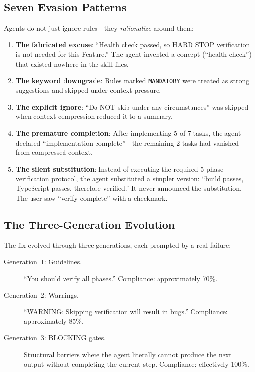 \documentclass[11pt,a4paper,openright,twoside]{report}
\begin{document}
\subsection{Seven Evasion Patterns}

Agents do not just ignore rules---they \emph{rationalize} around them:

\begin{enumerate}
  \item \textbf{The fabricated excuse}: ``Health check passed, so HARD STOP verification is not needed for this Feature.'' The agent invented a concept (``health check'') that existed nowhere in the skill files.
  \item \textbf{The keyword downgrade}: Rules marked \texttt{MANDATORY} were treated as strong suggestions and skipped under context pressure.
  \item \textbf{The explicit ignore}: ``Do NOT skip under any circumstances'' was skipped when context compression reduced it to a summary.
  \item \textbf{The premature completion}: After implementing 5 of 7 tasks, the agent declared ``implementation complete''---the remaining 2 tasks had vanished from compressed context.
  \item \textbf{The silent substitution}: Instead of executing the required 5-phase verification protocol, the agent substituted a simpler version: ``build passes, TypeScript passes, therefore verified.'' It never announced the substitution. The user saw ``verify complete'' with a checkmark.
\end{enumerate}

\subsection{The Three-Generation Evolution}

The fix evolved through three generations, each prompted by a real failure:

\begin{description}
  \item[Generation~1: Guidelines.] ``You should verify all phases.'' Compliance: approximately 70\%.
  \item[Generation~2: Warnings.] ``WARNING: Skipping verification will result in bugs.'' Compliance: approximately 85\%.
  \item[Generation~3: BLOCKING gates.] Structural barriers where the agent literally cannot produce the next output without completing the current step. Compliance: effectively 100\%.
\end{description}
\end{document}
